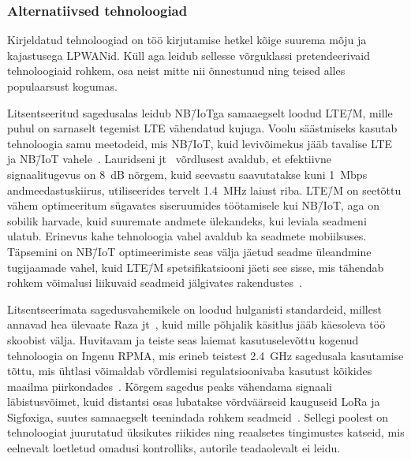 \documentclass[12pt]{article}
\begin{document}
    \subsubsection{Alternatiivsed tehnoloogiad}

    Kirjeldatud tehnoloogiad on töö kirjutamise hetkel kõige suurema mõju ja kajastusega LPWANid.
    Küll aga leidub sellesse võrguklassi pretendeerivaid tehnoloogiaid rohkem, osa neist mitte nii õnnestunud ning teised alles populaarsust kogumas.

    Litsentseeritud sagedusalas leidub NB\=/IoTga samaaegselt loodud LTE\=/M, mille puhul on sarnaselt tegemist LTE vähendatud kujuga.
    Voolu säästmiseks kasutab tehnoloogia samu meetodeid, mis NB\=/IoT, kuid levivõimekus jääb tavalise LTE ja NB\=/IoT vahele~\cite{benhiba2018comparative}.
    Lauridseni jt~\cite{lauridsen2016coverage} võrdlusest avaldub, et efektiivne signaalitugevus on \SI{8}{\deci\bel} nõrgem, kuid seevastu saavutatakse kuni 1~Mbps andmeedastuskiirus, utiliseerides tervelt \SI{1,4}{\mega\hertz} laiust riba.
    LTE\=/M on seetõttu vähem optimeeritum sügavates siseruumides töötamisele kui NB\=/IoT, aga on sobilik harvade, kuid suuremate andmete ülekandeks, kui leviala seadmeni ulatub.
    Erinevus kahe tehnoloogia vahel avaldub ka seadmete mobiilsuses.
    Täpsemini on NB\=/IoT optimeerimiste seas välja jäetud seadme üleandmine tugijaamade vahel, kuid LTE\=/M spetsifikatsiooni jäeti see sisse, mis tähendab rohkem võimalusi liikuvaid seadmeid jälgivates rakendustes~\cite{xuyao}.

    Litsentseerimata sagedusvahemikele on loodud hulganisti standardeid, millest annavad hea ülevaate Raza jt~\cite{raza}, kuid mille põhjalik käsitlus jääb käesoleva töö skoobist välja.
    Huvitavam ja teiste seas laiemat kasutuselevõttu kogenud tehnoloogia on Ingenu RPMA, mis erineb teistest \SI{2.4}{\giga\hertz} sagedusala kasutamise tõttu, mis ühtlasi võimaldab võrdlemisi regulatsioonivaba kasutust kõikides maailma piirkondades~\cite{queralta2019comparative}.
    Kõrgem sagedus peaks vähendama signaali läbistusvõimet, kuid distantsi osas lubatakse võrdväärseid kauguseid LoRa ja Sigfoxiga, suutes samaaegselt teenindada rohkem seadmeid~\cite{raza}.
    Sellegi poolest on tehnoloogiat juurutatud üksikutes riikides ning reaalsetes tingimustes katseid, mis eelnevalt loetletud omadusi kontrolliks, autorile teadaolevalt ei leidu.

    \def\tabularxcolumn#1{m{#1}}
\end{document}
